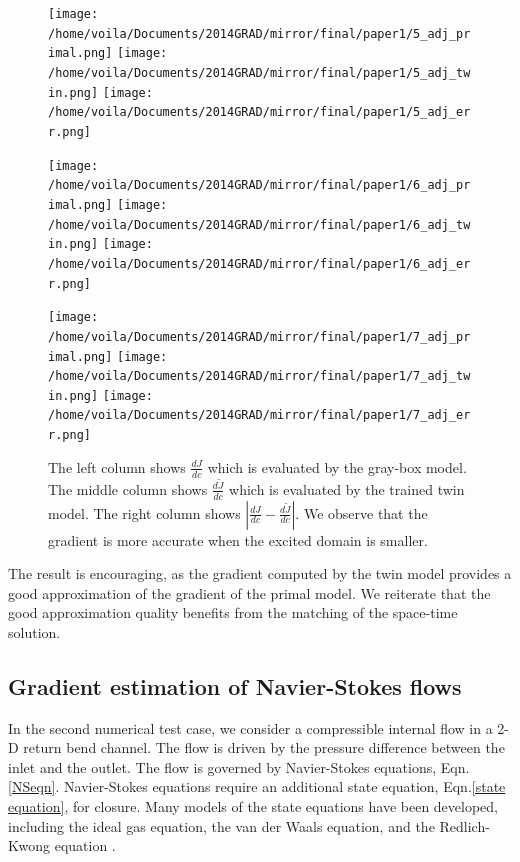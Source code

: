 \documentclass[a4paper,onecolumn]{article}
\theoremstyle{remark}
\begin{document}
\vspace{-1cm}
\begin{figure}[H]\begin{center}
    \texttt{[image: /home/voila/Documents/2014GRAD/mirror/final/paper1/5\_adj\_primal.png]}
    \texttt{[image: /home/voila/Documents/2014GRAD/mirror/final/paper1/5\_adj\_twin.png]}
    \texttt{[image: /home/voila/Documents/2014GRAD/mirror/final/paper1/5\_adj\_err.png]}
\end{center}\end{figure}
\vspace{-1cm}
\begin{figure}[H]\begin{center}
    \texttt{[image: /home/voila/Documents/2014GRAD/mirror/final/paper1/6\_adj\_primal.png]}
    \texttt{[image: /home/voila/Documents/2014GRAD/mirror/final/paper1/6\_adj\_twin.png]}
    \texttt{[image: /home/voila/Documents/2014GRAD/mirror/final/paper1/6\_adj\_err.png]}
\end{center}\end{figure}
\vspace{-1cm}
\begin{figure}[H]\begin{center}
    \texttt{[image: /home/voila/Documents/2014GRAD/mirror/final/paper1/7\_adj\_primal.png]}
    \texttt{[image: /home/voila/Documents/2014GRAD/mirror/final/paper1/7\_adj\_twin.png]}
    \texttt{[image: /home/voila/Documents/2014GRAD/mirror/final/paper1/7\_adj\_err.png]}
    \label{fig:sol compare}
    \caption{The left column shows $\frac{dJ}{dc}$ which is evaluated by the gray-box model. 
             The middle column shows $\frac{d\tilde{J}}{dc}$ which is evaluated by the trained twin model.
             The right column shows $\left|\frac{dJ}{dc} - \frac{d\tilde{J}}{dc}\right|$.
             We observe that the gradient is more accurate when the excited domain is smaller.}
\end{center}\end{figure}


\indent The result is encouraging, as the gradient computed by the twin model provides
a good approximation
of the gradient of the primal model. We reiterate that the good approximation quality benefits from 
the matching of the space-time solution.\\

\subsection{Gradient estimation of Navier-Stokes flows}
\indent In the second numerical test case, we consider
a compressible internal flow in a 2-D return bend channel.
The flow is driven by the pressure difference between the inlet and the outlet.
The flow is governed by Navier-Stokes equations, Eqn.\eqref{NSeqn}.
Navier-Stokes equations require an additional state equation, Eqn.\eqref{state equation}, for closure.
Many models of the state equations have been developed, including the ideal gas equation, the
van der Waals equation, and the Redlich-Kwong equation \cite{state eqns}.\\
\end{document}
